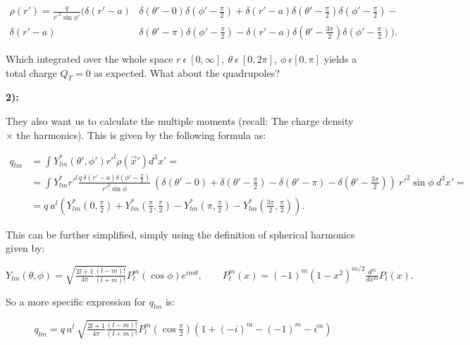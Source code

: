 \begin{equation}
	\begin{split}
		\rho (r') = \tfrac{q}{r'^{2} \sin\phi'} (\delta (r' -a) &\delta(\theta' - 0) \delta (\phi' - \tfrac{\pi}{2}) + \delta (r' -a) \delta(\theta' - \tfrac{\pi}{2}) \delta (\phi' - \tfrac{\pi}{2})-\\
		\delta (r' -a) &\delta(\theta' - \pi) \delta (\phi' - \tfrac{\pi}{2}) -\delta (r' -a) \delta(\theta' - \tfrac{3\pi}{2}) \delta (\phi' - \tfrac{\pi}{2})).
	\end{split}
\end{equation}

Which integrated over the whole space $r \:\epsilon\: [0, \infty],\: \theta\: \epsilon \:[0, 2\pi], \:\phi \:\epsilon [0, \pi]$ yields a total charge $Q_{T}=0$ as expected. What about the quadrupoles?

\textbf{2):}

They also want us to calculate the multiple moments (recall: The charge density $\times$ the harmonics). This is given by the following formula as:

\begin{equation}
	\begin{split}
	q_{lm} &= \int Y^{*}_{lm} (\theta', \phi')r'^{l} \rho (\vec{x}') d^{3}x'=\\
	&= \int Y^{*}_{lm}r'^{l} \tfrac{q \:\delta (r' -a) \delta (\phi' - \tfrac{\pi}{2})}{r'^{2} \sin \phi}\: \left( \delta(\theta' - 0) + \delta(\theta' - \tfrac{\pi}{2}) -\delta(\theta' - \pi) - \delta(\theta' - \tfrac{3\pi}{2})\right)\: r'^{2} \sin \phi \: d^{3}x'=\\
	& = q \: a^{l} \left( Y^{*}_{lm} (0, \tfrac{\pi}{2}) + Y^{*}_{lm} (\tfrac{\pi}{2}, \tfrac{\pi}{2}) - Y^{*}_{lm} (\pi, \tfrac{\pi}{2}) - Y^{*}_{lm} (\tfrac{3\pi}{2}, \tfrac{\pi}{2})\right).
	\end{split}
\end{equation}

This can be further simplified, simply using the definition of spherical harmonics given by:

\begin{equation}
	Y_{lm} (\theta, \phi) = \sqrt{\tfrac{2l+1}{4\pi}\tfrac{(l-m)!}{(l+m)!}} P^{m}_{l} (\cos \phi) e^{im\theta}, \quad \quad P^{m}_{l} (x) = (-1)^{m} (1- x^{2})^{m/2} \tfrac{d^{m}}{dx^{m}} P_{l} (x).
\end{equation}

So a more specific expression for $q_{lm}$ is:

\begin{equation}
	q_{lm} = q \: a^{l} \: \sqrt{\tfrac{2l+1}{4\pi}\tfrac{(l-m)!}{(l+m)!}} P^{m}_{l} (\cos \tfrac{\pi}{2}) \left(1 + (-i)^{m} - (-1)^{m}- i^{m}\right)
\end{equation}

